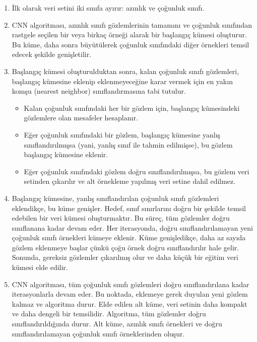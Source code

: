 \begin{enumerate}
    \item İlk olarak veri setini iki sınıfa ayırır: azınlık ve çoğunluk sınıfı.
    \item CNN algoritması, azınlık sınıfı gözlemlerinin tamamını ve çoğunluk sınıfından rastgele seçilen bir veya birkaç örneği alarak bir başlangıç kümesi oluşturur. Bu küme, daha sonra büyütülerek çoğunluk sınıfındaki diğer örnekleri temsil edecek şekilde genişletilir.
    \item Başlangıç kümesi oluşturulduktan sonra, kalan çoğunluk sınıfı gözlemleri, başlangıç kümesine eklenip eklenmeyeceğine karar vermek için en yakın komşu (nearest neighbor) sınıflandırmasına tabi tutulur. 
    \begin{itemize}
        \item Kalan çoğunluk sınıfındaki her bir gözlem için, başlangıç kümesindeki gözlemlere olan mesafeler hesaplanır. 
        \item Eğer çoğunluk sınıfındaki bir gözlem, başlangıç kümesine yanlış sınıflandırılmışsa (yani, yanlış sınıf ile tahmin edilmişse), bu gözlem başlangıç kümesine eklenir. 
        \item Eğer çoğunluk sınıfındaki gözlem doğru sınıflandırılmışsa, bu gözlem veri setinden çıkarılır ve alt örnekleme yapılmış veri setine dahil edilmez.
    \end{itemize}
    \item Başlangıç kümesine, yanlış sınıflandırılan çoğunluk sınıfı gözlemleri eklendikçe, bu küme genişler. Hedef, sınıf sınırlarını doğru bir şekilde temsil edebilen bir veri kümesi oluşturmaktır. Bu süreç, tüm gözlemler doğru sınıflanana kadar devam eder. Her iterasyonda, doğru sınıflandırılamayan yeni çoğunluk sınıfı örnekleri kümeye eklenir. Küme genişledikçe, daha az sayıda gözlem eklenmeye başlar çünkü çoğu örnek doğru sınıflandırılır hale gelir. Sonunda, gereksiz gözlemler çıkarılmış olur ve daha küçük bir eğitim veri kümesi elde edilir.
    \item CNN algoritması, tüm çoğunluk sınıfı gözlemleri doğru sınıflandırılana kadar iterasyonlarla devam eder. Bu noktada, eklemeye gerek duyulan yeni gözlem kalmaz ve algoritma durur. Elde edilen alt küme, veri setinin daha kompakt ve daha dengeli bir temsilidir. Algoritma, tüm gözlemler doğru sınıflandırıldığında durur. Alt küme, azınlık sınıfı örnekleri ve doğru sınıflandırılamayan çoğunluk sınıfı örneklerinden oluşur.
\end{enumerate}

